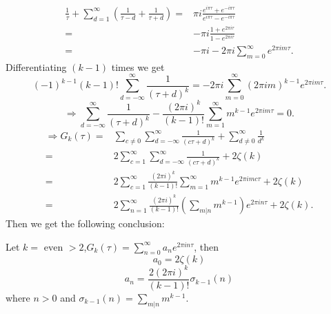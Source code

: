 \begin{align*}
  \frac{1}{\tau}+\sum_{d=1}^{\infty} \left( \frac{1}{\tau-d}+\frac{1}{\tau+d} \right) =& \pi i \frac{e^{i\pi\tau}+e^{-i\pi\tau}}{e^{i\pi\tau}-e^{-i\pi\tau}}\\
  =& -\pi i \frac{1+e^{2\pi i\tau}}{1-e^{2\pi i\tau}}\\
  =& -\pi i-2\pi i \sum_{m=0}^{\infty} e^{2\pi im\tau}
.\end{align*}
Differentiating $(k-1)$ times we get
\[
  (-1)^{k-1}(k-1)!\sum_{d=-\infty}^{\infty} \frac{1}{(\tau+d)^{k}}=-2\pi i \sum_{m=0}^{\infty} (2\pi im)^{k-1}e^{2\pi im\tau}.
\] 
\[
  \Rightarrow \sum_{d=-\infty}^{\infty} \frac{1}{(\tau+d)^{k}}-\frac{(2\pi i)^{k}}{(k-1)!}\sum_{m=1}^{\infty} m^{k-1}e^{2\pi im\tau}=0.
\] 
\begin{align*}
  \Rightarrow G_k(\tau)=&\sum_{c\neq 0}^{} \sum_{d=-\infty}^{\infty} \frac{1}{(c\tau+d)^{k}}+\sum_{d\neq 0}^{\infty} \frac{1}{d^{k}}\\
  =& 2 \sum_{c=1}^{\infty} \sum_{d=-\infty}^{\infty} \frac{1}{(c\tau+d)^{k}}+2\zeta(k)\\
  =& 2 \sum_{c=1}^{\infty} \frac{(2\pi i)^{k}}{(k-1)!}\sum_{m=1}^{\infty} m^{k-1}e^{2\pi imc\tau}+2\zeta(k)\\
  =& 2 \sum_{n=1}^{\infty} \frac{(2\pi i)^{k}}{(k-1)!}\left( \sum_{m|n}^{} m^{k-1} \right) e^{2\pi in\tau}+2\zeta(k)
.\end{align*}
Then we get the following conclusion:
\begin{proposition}
  Let $k= \text{ even }>2$,$G_k(\tau)=\sum_{n=0}^{\infty} a_ne^{2\pi in\tau}$, then
  \[
    a_0=2\zeta(k)
  \] 
  \[
    a_n=\frac{2(2\pi i)^{k}}{(k-1)!}\sigma_{k-1}(n)
  \] 
  where $n>0$ and $\sigma_{k-1}(n)=\sum_{m|n} m^{k-1} $.
\end{proposition}

